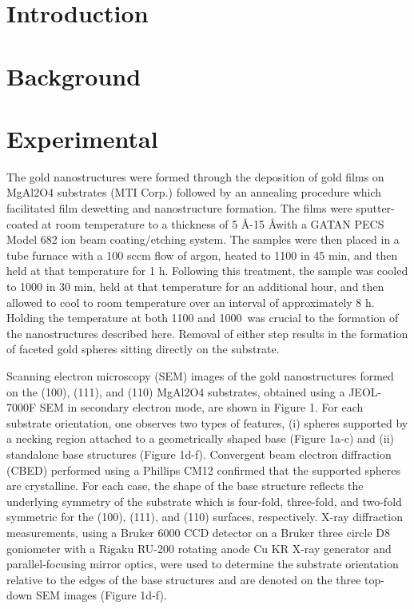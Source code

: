 \section{Introduction}

\section{Background}

\section{Experimental}
The gold nanostructures were formed through the deposition of gold films on MgAl2O4 substrates (MTI Corp.)
followed by an annealing procedure which facilitated film
dewetting and nanostructure formation. The films were
sputter-coated at room temperature to a thickness of 5 \AA-15
\AA with a GATAN PECS Model 682 ion beam coating/etching system. The samples were then placed in a tube
furnace with a 100 sccm flow of argon, heated to 1100\degree\celsius
in 45 min, and then held at that temperature for 1 h.
Following this treatment, the sample was cooled to 1000\degree\celsius
in 30 min, held at that temperature for an additional hour,
and then allowed to cool to room temperature over an interval
of approximately 8 h. Holding the temperature at both 1100
and 1000\degree\celsius~was crucial to the formation of the nanostructures described here. Removal of either step results in the formation of faceted gold spheres sitting directly on the substrate.

Scanning electron microscopy (SEM) images of the gold
nanostructures formed on the (100), (111), and (110)
MgAl2O4 substrates, obtained using a JEOL-7000F SEM in
secondary electron mode, are shown in Figure 1. For each
substrate orientation, one observes two types of features, (i)
spheres supported by a necking region attached to a geometrically shaped base (Figure 1a-c) and (ii) standalone base
structures (Figure 1d-f). Convergent beam electron diffraction (CBED) performed using a Phillips CM12 confirmed
that the supported spheres are crystalline. For each case, the shape of the base structure reflects the underlying symmetry
of the substrate which is four-fold, three-fold, and two-fold
symmetric for the (100), (111), and (110) surfaces, respectively. X-ray diffraction measurements, using a Bruker 6000
CCD detector on a Bruker three circle D8 goniometer with
a Rigaku RU-200 rotating anode Cu KR X-ray generator and
parallel-focusing mirror optics, were used to determine the
substrate orientation relative to the edges of the base
structures and are denoted on the three top-down SEM
images (Figure 1d-f).
